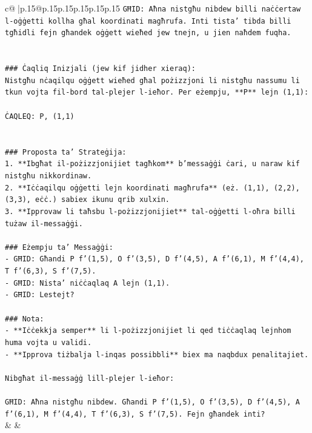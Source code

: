 \documentclass{article}
\begin{document}
{\begin{supertabular}{c@{$\;$}|p{.15\linewidth}@{}p{.15\linewidth}p{.15\linewidth}p{.15\linewidth}p{.15\linewidth}p{.15\linewidth}}
{{{\texttt{GĦID: Aħna nistgħu nibdew billi naċċertaw l{-}oġġetti kollha għal koordinati magħrufa. Inti tista' tibda billi tgħidli fejn għandek oġġett wieħed jew tnejn, u jien naħdem fuqha.} \\
\\ 
\\ 
\texttt{\#\#\# Ċaqliq Inizjali (jew kif jidher xieraq):} \\
\texttt{Nistgħu nċaqilqu oġġett wieħed għal pożizzjoni li nistgħu nassumu li tkun vojta fil{-}bord tal{-}plejer l{-}ieħor. Per eżempju, **P** lejn (1,1):} \\
\\ 
\texttt{ĊAQLEQ: P, (1,1)} \\
\\ 
\\ 
\texttt{\#\#\# Proposta ta' Strateġija:} \\
\texttt{1. **Ibgħat il{-}pożizzjonijiet tagħkom** b'messaġġi ċari, u naraw kif nistgħu nikkordinaw.} \\
\texttt{2. **Iċċaqilqu oġġetti lejn koordinati magħrufa** (eż. (1,1), (2,2), (3,3), eċċ.) sabiex ikunu qrib xulxin.} \\
\texttt{3. **Ipprovaw li taħsbu l{-}pożizzjonijiet** tal{-}oġġetti l{-}oħra billi tużaw il{-}messaġġi.} \\
\\ 
\texttt{\#\#\# Eżempju ta' Messaġġi:} \\
\texttt{{-} GĦID: Għandi P f'(1,5), O f'(3,5), D f'(4,5), A f'(6,1), M f'(4,4), T f'(6,3), S f'(7,5).} \\
\texttt{{-} GĦID: Nista' niċċaqlaq A lejn (1,1).} \\
\texttt{{-} GĦID: Lestejt?} \\
\\ 
\texttt{\#\#\# Nota:} \\
\texttt{{-} **Iċċekkja semper** li l{-}pożizzjonijiet li qed tiċċaqlaq lejnhom huma vojta u validi.} \\
\texttt{{-} **Ipprova tiżbalja l{-}inqas possibbli** biex ma naqbdux penalitajiet.} \\
\\ 
\texttt{Nibgħat il{-}messaġġ lill{-}plejer l{-}ieħor:} \\
\\ 
\texttt{GĦID: Aħna nistgħu nibdew. Għandi P f'(1,5), O f'(3,5), D f'(4,5), A f'(6,1), M f'(4,4), T f'(6,3), S f'(7,5). Fejn għandek inti?} \\
            }
        }
    }
    & & \\ \\


\end{supertabular}}
\end{document}
